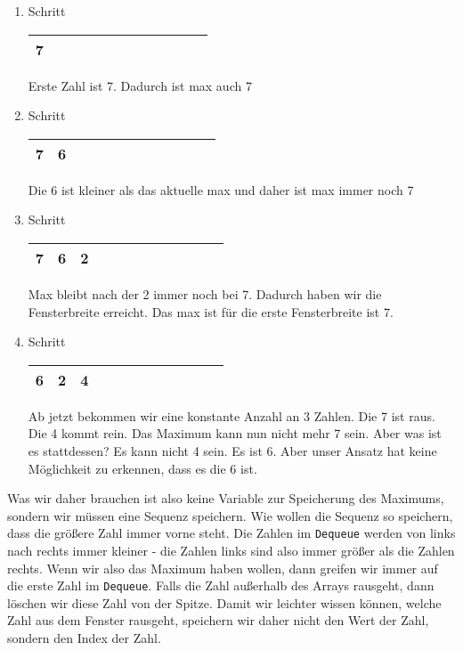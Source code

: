 \documentclass{book}
\begin{document}
\begin{enumerate} 
	\item Schritt
	
	\begin{tabular}{|l|l|l|l|l|l|l|l|l|l|l|l|} 
		\hline
		7 \\
		\hline
	\end{tabular} 

	Erste Zahl ist 7. Dadurch ist max auch 7
	\item Schritt
	
	\begin{tabular}{|l|l|l|l|l|l|l|l|l|l|l|l|} 
		\hline
		7 & 6 \\
		\hline
	\end{tabular} 

	Die 6 ist kleiner als das aktuelle max und daher ist max immer noch 7
	\item Schritt
	
	\begin{tabular}{|l|l|l|l|l|l|l|l|l|l|l|l|} 
		\hline
		7 & 6 & 2\\
		\hline
	\end{tabular} 
			
	Max bleibt nach der 2 immer noch bei 7. Dadurch haben wir die Fensterbreite erreicht. Das max ist für die erste Fensterbreite ist 7.
	
	\item Schritt
	
	\begin{tabular}{|l|l|l|l|l|l|l|l|l|l|l|l|} 
		\hline
		6 & 2 & 4\\
		\hline
	\end{tabular}  

	Ab jetzt bekommen wir eine konstante Anzahl an 3 Zahlen. Die 7 ist raus. Die 4 kommt rein. Das Maximum kann nun nicht mehr 7 sein. Aber was ist es stattdessen? Es kann nicht 4 sein. Es ist 6. Aber unser Ansatz hat keine Möglichkeit zu erkennen, dass es die 6 ist. 
\end{enumerate}

Was wir daher brauchen ist also keine Variable zur Speicherung des Maximums, sondern wir müssen eine Sequenz speichern. Wie wollen die Sequenz so speichern, dass die größere Zahl immer vorne steht. Die Zahlen im \lstinline|Dequeue| werden von links nach rechts immer kleiner - die Zahlen links sind also immer größer als die Zahlen rechts. Wenn wir also das Maximum haben wollen, dann greifen wir immer auf die erste Zahl im \lstinline|Dequeue|. Falls die Zahl außerhalb des Arrays rausgeht, dann löschen wir diese Zahl von der Spitze. Damit wir leichter wissen können, welche Zahl aus dem Fenster rausgeht, speichern wir daher nicht den Wert der Zahl, sondern den Index der Zahl.
\end{document}
